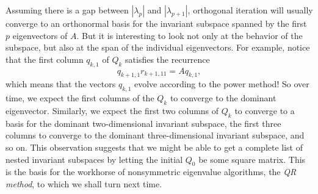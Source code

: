 \documentclass[12pt, leqno]{article} %
\begin{document}
Assuming there is a gap between $|\lambda_{p}|$ and $|\lambda_{p+1}|$,
orthogonal iteration will usually converge to an orthonormal basis
for the invariant subspace spanned by the first $p$ eigenvectors of $A$.
But it is interesting to look not only at the behavior of the subspace,
but also at the span of the individual eigenvectors.  For example,
notice that the first column $q_{k,1}$ of $Q_k$ satisfies the recurrence
\[
  q_{k+1,1} r_{k+1,11} = A q_{k,1},
\]
which means that the vectors $q_{k,1}$ evolve according to the power method!
So over time, we expect the first columns of the $Q_k$ to converge to the
dominant eigenvector.  Similarly, we expect the first two columns of $Q_k$
to converge to a basis for the dominant two-dimensional invariant subspace,
the first three columns to converge to the dominant three-dimensional
invariant subspace, and so on.  This observation suggests that we might be
able to get a complete list of nested invariant subspaces by letting the
initial $Q_0$ be some square matrix.  This is the basis for the workhorse
of nonsymmetric eigenvalue algorithms, the {\em QR method}, to which we
shall turn next time.
\end{document}
